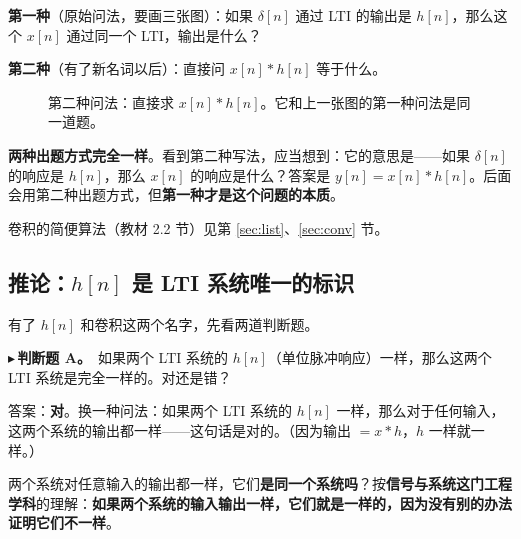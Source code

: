 \documentclass[UTF8,a4paper,11pt]{ctexart}
\newcommand{\stemr}[7]{%
  \begin{scope}[shift={(#1,#2)},x=0.38cm,y=#5 cm]
    \pgfmathtruncatemacro{\len}{dim({#4,0})-1}%
    \pgfmathtruncatemacro{\ymax}{max(#4,#4)}%
    \pgfmathtruncatemacro{\ymin}{min(#4,#4)}%
    \pgfmathsetmacro{\ybot}{min(-0.45/#5,\ymin-0.12/#5)}%
    \draw[->] ({#6-0.5},0) -- ({#7+0.7},0) node[right,font=\tiny] {$n$};
    \draw[->] (0,\ybot) -- (0,{1.9/#5});
    \foreach \v [count=\k from 0] in {#4}{%
      \pgfmathtruncatemacro{\nn}{#3+\k}
      \draw[thick,blue!60!black] (\nn,0) -- (\nn,\v);
      \node[circle,fill=blue!60!black,inner sep=1.1pt] at (\nn,\v) {};
      \ifnum\nn<0 \def\side{east}\else\def\side{west}\fi
      \ifnum\v>0 \node[font=\scriptsize,anchor=south \side,inner sep=1pt] at (\nn,\v) {\v};\fi
      \ifnum\v<0 \node[font=\scriptsize,anchor=north \side,inner sep=1pt] at (\nn,\v) {\v};\fi}%
    \foreach \t in {#6,...,#7}{%
      \pgfmathtruncatemacro{\kk}{\t-(#3)}%
      \def\vv{0}%
      \ifnum\kk>-1 \ifnum\kk<\len\relax \pgfmathtruncatemacro{\vv}{{#4,0}[\kk]}\fi\fi
      \draw (\t,0) -- (\t,{-0.09/#5});
      \ifnum\vv<0
        \node[font=\tiny,gray!60!black,anchor=south,fill=white,inner sep=0.6pt] at (\t,{0.04/#5}) {$\t$};
      \else
        \node[font=\tiny,gray!60!black,anchor=north,fill=white,inner sep=0.6pt] at (\t,{-0.09/#5}) {$\t$};
      \fi}%
    \ifnum\ymax>0
      \draw (0,\ymax) -- (-0.2,\ymax) node[anchor=east,font=\tiny,gray!60!black,fill=white,inner sep=0.6pt] {$\ymax$};
    \fi
    \pgfmathtruncatemacro{\showmin}{(\ymin*#5)<-0.33}%
    \ifnum\showmin=1
      \draw (0,\ymin) -- (-0.2,\ymin) node[anchor=east,font=\tiny,gray!60!black,fill=white,inner sep=0.6pt] {$\ymin$};
    \fi
  \end{scope}}
\newcommand{\stemat}[5]{\stemr{#1}{#2}{#3}{#4}{#5}{-3}{5}}
\newcommand{\ltirow}[9]{%
  \node[anchor=east,font=\footnotesize] at (2.9,{#1+0.7}) {#7};
  \stemat{4.6}{#1}{#2}{#3}{#6}
  \draw[->,thick] (6.9,{#1+0.5}) -- (7.9,{#1+0.5});
  \node[font=\footnotesize,above] at (7.4,{#1+0.5}) {LTI};
  \stemat{10.6}{#1}{#4}{#5}{#9}
  \node[anchor=west,font=\footnotesize,text width=2.4cm] at (12.9,{#1+0.7}) {#8};}
\newcommand{\ltiq}[5]{%
  \node[anchor=east,font=\footnotesize] at (2.9,{#1+0.7}) {#5};
  \stemat{4.6}{#1}{#2}{#3}{#4}
  \draw[->,thick] (6.9,{#1+0.5}) -- (7.9,{#1+0.5});
  \node[font=\footnotesize,above] at (7.4,{#1+0.5}) {LTI};
  \node[font=\large] at (9.4,{#1+0.5}) {$y[n]=\,?$};}
\newcounter{ex}[section]
\newcommand{\point}[1]{\par\addvspace{1ex}\noindent\textcolor{ptteal}{$\blacktriangleright$\,\textbf{#1}}\ }
\begin{document}
\textbf{第一种}（原始问法，要画三张图）：如果 $\delta[n]$ 通过 LTI 的输出是 $h[n]$，那么这个 $x[n]$ 通过同一个 LTI，输出是什么？

\begin{figure}[H]
\centering
{}
\end{figure}

\textbf{第二种}（有了新名词以后）：直接问 $x[n]\ast h[n]$ 等于什么。

\begin{figure}[H]
\centering
{}
\caption{第二种问法：直接求 $x[n]\ast h[n]$。它和上一张图的第一种问法是同一道题。}
\end{figure}

\textbf{两种出题方式完全一样}。看到第二种写法，应当想到：它的意思是——如果 $\delta[n]$ 的响应是 $h[n]$，那么 $x[n]$ 的响应是什么？答案是 $y[n]=x[n]\ast h[n]$。后面会用第二种出题方式，但\textbf{第一种才是这个问题的本质}。

卷积的简便算法（教材 2.2 节）见第 \ref{sec:list}、\ref{sec:conv} 节。

\subsection{\texorpdfstring{推论：$h[n]$ 是 LTI 系统唯一的标识}{推论：h[n] 是 LTI 系统唯一的标识}}
有了 $h[n]$ 和卷积这两个名字，先看两道判断题。

\point{判断题 A。}如果两个 LTI 系统的 $h[n]$（单位脉冲响应）一样，那么这两个 LTI 系统是完全一样的。对还是错？

答案：\textbf{对}。换一种问法：如果两个 LTI 系统的 $h[n]$ 一样，那么对于任何输入，这两个系统的输出都一样——这句话是对的。（因为输出 $=x\ast h$，$h$ 一样就一样。）

两个系统对任意输入的输出都一样，它们\textbf{是同一个系统吗}？按\textbf{信号与系统这门工程学科}的理解：\textbf{如果两个系统的输入输出一样，它们就是一样的，因为没有别的办法证明它们不一样}。
\end{document}
